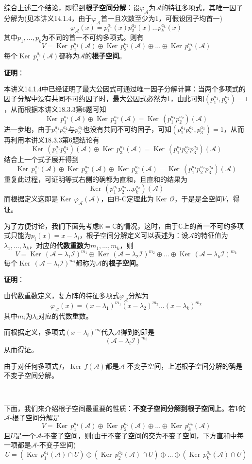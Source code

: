 \documentclass[a4paper,UTF8,fontset=windows,AutoFakeBold]{ctexart}
\DeclareMathOperator{\Ker}{Ker\,}
\newcommand*{\ma}{\mathcal{A}}
\newcommand*{\mi}{\mathcal{I}}
\newcommand*{\mo}{\mathcal{O}}
\newcommand*{\note}{\noindent *}
\newcommand{\proo}[1]{{\vspace{5pt}\kaishu\noindent\textbf{证明}：\vspace{-3pt}
\begin{compactitem}
    \item[] #1
\end{compactitem}
}}
\begin{document}
综合上述三个结论，即得到\textbf{根子空间分解}：设$\varphi_\ma$为$\ma$的特征多项式，其唯一因子分解为(见本讲义14.1.4，由于$\varphi_\ma$首一且次数至少为1，可假设因子均首一)
$$\varphi_\ma(x)=p_1^{a_1}(x)p_2^{a_2}(x)\dots p_k^{a_k}(x)$$
其中$p_1,\dots,p_k$为不同的首一不可约多项式。则有
$$V=\Ker p_1^{a_1}(\ma)\oplus\Ker p_2^{a_2}(\ma)\oplus\dots\oplus \Ker p_k^{a_k}(\ma)$$
每个$\Ker p_i^{a_i}(\ma)$都称为$\ma$的\textbf{根子空间}。

\proo{
    本讲义14.1.4中已经证明了最大公因式可通过唯一因子分解计算：当两个多项式的因子分解中没有共同不可约因子时，最大公因式必然为1，由此可知$(p_1^{a_1},p_2^{a_2})=1$，从而根据本讲义18.3.3第6题可知
    $$\Ker p_1^{a_1}(\ma)\oplus\Ker p_2^{a_2}(\ma)=\Ker(p_1^{a_1}p_2^{a_2})(\ma)$$
    进一步地，由于$p_1^{a_1}p_2^{a_2}$与$p_3^{a_3}$也没有共同不可约因子，可知$(p_1^{a_1}p_2^{a_2},p_3^{a_3})=1$，从而再利用本讲义18.3.3第6题结论有
    $$\Ker(p_1^{a_1}p_2^{a_2})(\ma)\oplus\Ker p_3^{a_3}(\ma)=\Ker(p_1^{a_1}p_2^{a_2}p_3^{a_3})(\ma)$$
    结合上一个式子展开得到
    $$\Ker p_1^{a_1}(\ma)\oplus\Ker p_2^{a_2}(\ma)\oplus\Ker p_3^{a_3}(\ma)=\Ker(p_1^{a_1}p_2^{a_2}p_3^{a_3})(\ma)$$
    重复此过程，可证明等式右侧的确都为直和，且直和的结果为
    $$\Ker(p_1^{a_1}p_2^{a_2}\dots p_k^{a_k})(\ma)$$
    而根据定义这即是$\Ker\varphi_\ma(\ma)$，由H-C定理此为$\Ker\mo$，于是是全空间$V$，得证。
}

为了方便讨论，我们下面先考虑$\mathbb{K}=\mathbb{C}$的情况，这时，由于$\mathbb{C}$上的首一不可约多项式只能为$p_i(x)=x-\lambda_i$，根子空间分解定义可以表述为：设$\ma$的特征值为$\lambda_1,\dots,\lambda_k$，对应的\textbf{代数重数}为$m_1,\dots,m_k$，则
$$V=\Ker(\ma-\lambda_1\mi)^{m_1}\oplus\Ker(\ma-\lambda_2\mi)^{m_2}\oplus\dots\oplus\Ker(\ma-\lambda_k\mi)^{m_k}$$
每个$\Ker(\ma-\lambda_i\mi)^{m_i}$都称为$\ma$的\textbf{根子空间}。

\proo{
    由代数重数定义，复方阵的特征多项式$\varphi_\ma$分解为
    $$\varphi_\ma(x)=(x-\lambda_1)^{m_1}(x-\lambda_2)^{m_2}\dots(x-\lambda_k)^{m_k}$$
    其中$m_i$为$\lambda_i$对应的代数重数。

    而根据定义，多项式$(x-\lambda_i)^{m_i}$代入$\ma$得到的即是
    $$(\ma-\lambda_i\mi)^{m_i}$$
    从而得证。
}

\note 由于对任何多项式$f$，$\Ker f(\ma)$都是$\ma$-不变子空间，上述根子空间分解的确是不变子空间分解。

\

下面，我们来介绍根子空间最重要的性质：\textbf{不变子空间分解到根子空间上}。若$V$的$\ma$-根子空间分解是
$$V=\Ker p_1^{a_1}(\ma)\oplus\Ker p_2^{a_2}(\ma)\oplus\dots\oplus \Ker p_k^{a_k}(\ma)$$
且$U$是一个$\ma$-不变子空间，则(由于不变子空间的交为不变子空间，下方直和中每一项都是$\ma$-不变子空间)
$$U=(\Ker p_1^{a_1}(\ma)\cap U)\oplus(\Ker p_2^{a_2}(\ma)\cap U)\oplus\dots\oplus(\Ker p_k^{a_k}(\ma)\cap U)$$
\end{document}
